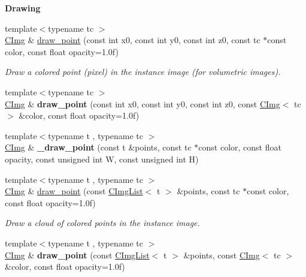 \begin{Indent}{\bf Drawing}
\begin{DoxyCompactItemize}
\item 
{\footnotesize template$<$typename tc $>$ }\\\hyperlink{structcimg__library_1_1_c_img}{C\-Img} \& \hyperlink{structcimg__library_1_1_c_img_a6688c2dbbdd2e404279680be1721828c}{draw\-\_\-point} (const int x0, const int y0, const int z0, const tc $\ast$const color, const float opacity=1.\-0f)
\begin{DoxyCompactList}\small\item\em Draw a colored point (pixel) in the instance image (for volumetric images). \end{DoxyCompactList}\item 
\hypertarget{structcimg__library_1_1_c_img_a091b33097c719a4f3c3893ec6f8f6d6a}{{\footnotesize template$<$typename tc $>$ }\\\hyperlink{structcimg__library_1_1_c_img}{C\-Img} \& {\bfseries draw\-\_\-point} (const int x0, const int y0, const int z0, const \hyperlink{structcimg__library_1_1_c_img}{C\-Img}$<$ tc $>$ \&color, const float opacity=1.\-0f)}\label{structcimg__library_1_1_c_img_a091b33097c719a4f3c3893ec6f8f6d6a}

\item 
\hypertarget{structcimg__library_1_1_c_img_aba51ca68ca719125168190f825051682}{{\footnotesize template$<$typename t , typename tc $>$ }\\\hyperlink{structcimg__library_1_1_c_img}{C\-Img} \& {\bfseries \-\_\-draw\-\_\-point} (const t \&points, const tc $\ast$const color, const float opacity, const unsigned int W, const unsigned int H)}\label{structcimg__library_1_1_c_img_aba51ca68ca719125168190f825051682}

\item 
{\footnotesize template$<$typename t , typename tc $>$ }\\\hyperlink{structcimg__library_1_1_c_img}{C\-Img} \& \hyperlink{structcimg__library_1_1_c_img_abf58970dd5c1a58b6b182554cab1d785}{draw\-\_\-point} (const \hyperlink{structcimg__library_1_1_c_img_list}{C\-Img\-List}$<$ t $>$ \&points, const tc $\ast$const color, const float opacity=1.\-0f)
\begin{DoxyCompactList}\small\item\em Draw a cloud of colored points in the instance image. \end{DoxyCompactList}\item 
\hypertarget{structcimg__library_1_1_c_img_a45b04de6dd229dcdc8f144b107952a25}{{\footnotesize template$<$typename t , typename tc $>$ }\\\hyperlink{structcimg__library_1_1_c_img}{C\-Img} \& {\bfseries draw\-\_\-point} (const \hyperlink{structcimg__library_1_1_c_img_list}{C\-Img\-List}$<$ t $>$ \&points, const \hyperlink{structcimg__library_1_1_c_img}{C\-Img}$<$ tc $>$ \&color, const float opacity=1.\-0f)}\label{structcimg__library_1_1_c_img_a45b04de6dd229dcdc8f144b107952a25}


\end{DoxyCompactItemize}
\end{Indent}
